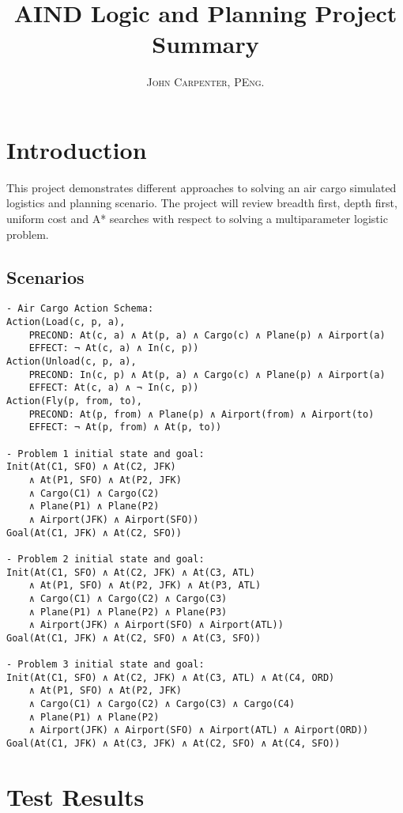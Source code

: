 \documentclass[paper=letter, fontsize=12pt]{article}
\title{\vspace{-15mm}\fontsize{24pt}{10pt}\selectfont\textbf{AIND Logic and Planning Project Summary}} %
\author{
\large
{\textsc{John Carpenter, PEng.}}\\[2mm]}
\date{}
\begin{document}
\maketitle %
\section{Introduction}

This project demonstrates different approaches to solving an air cargo simulated logistics and planning scenario. The project will review breadth first, depth first, uniform cost and A* searches with respect to solving a multiparameter logistic problem.

\subsection{Scenarios}
\begin{verbatim}
- Air Cargo Action Schema:
Action(Load(c, p, a),
	PRECOND: At(c, a) ∧ At(p, a) ∧ Cargo(c) ∧ Plane(p) ∧ Airport(a)
	EFFECT: ¬ At(c, a) ∧ In(c, p))
Action(Unload(c, p, a),
	PRECOND: In(c, p) ∧ At(p, a) ∧ Cargo(c) ∧ Plane(p) ∧ Airport(a)
	EFFECT: At(c, a) ∧ ¬ In(c, p))
Action(Fly(p, from, to),
	PRECOND: At(p, from) ∧ Plane(p) ∧ Airport(from) ∧ Airport(to)
	EFFECT: ¬ At(p, from) ∧ At(p, to))

- Problem 1 initial state and goal:
Init(At(C1, SFO) ∧ At(C2, JFK)
	∧ At(P1, SFO) ∧ At(P2, JFK)
	∧ Cargo(C1) ∧ Cargo(C2)
	∧ Plane(P1) ∧ Plane(P2)
	∧ Airport(JFK) ∧ Airport(SFO))
Goal(At(C1, JFK) ∧ At(C2, SFO))

- Problem 2 initial state and goal:
Init(At(C1, SFO) ∧ At(C2, JFK) ∧ At(C3, ATL)
	∧ At(P1, SFO) ∧ At(P2, JFK) ∧ At(P3, ATL)
	∧ Cargo(C1) ∧ Cargo(C2) ∧ Cargo(C3)
	∧ Plane(P1) ∧ Plane(P2) ∧ Plane(P3)
	∧ Airport(JFK) ∧ Airport(SFO) ∧ Airport(ATL))
Goal(At(C1, JFK) ∧ At(C2, SFO) ∧ At(C3, SFO))

- Problem 3 initial state and goal:
Init(At(C1, SFO) ∧ At(C2, JFK) ∧ At(C3, ATL) ∧ At(C4, ORD)
	∧ At(P1, SFO) ∧ At(P2, JFK)
	∧ Cargo(C1) ∧ Cargo(C2) ∧ Cargo(C3) ∧ Cargo(C4)
	∧ Plane(P1) ∧ Plane(P2)
	∧ Airport(JFK) ∧ Airport(SFO) ∧ Airport(ATL) ∧ Airport(ORD))
Goal(At(C1, JFK) ∧ At(C3, JFK) ∧ At(C2, SFO) ∧ At(C4, SFO))

\end{verbatim}


\section{Test Results}
\end{document}

